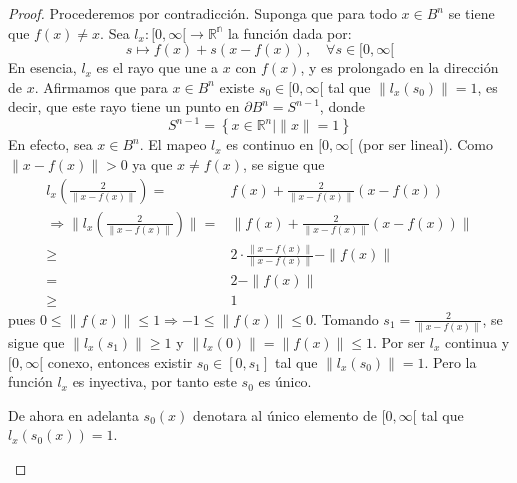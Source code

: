 \documentclass[12pt]{report}
\theoremstyle{largebreak}
\newcommand\cf[3]{\ensuremath{#1:#2\rightarrow#3}}
\begin{document}
\begin{proof}
    Procederemos por contradicción. Suponga que para todo $x\in B^n$ se tiene que $f(x)\neq x$. Sea $\cf{l_x}{[0,\infty[}{\mathbb{R^n}}$ la función dada por:
    \begin{equation*}
        s\mapsto f(x)+s\left(x-f(x)\right),\quad \forall s\in[0,\infty[
    \end{equation*}
    En esencia, $l_x$ es el rayo que une a $x$ con $f(x)$, y es prolongado en la dirección de $x$. Afirmamos que para $x\in B^n$ existe $s_0\in[0,\infty[$ tal que $\|l_x(s_0)\|=1$, es decir, que este rayo tiene un punto en $\partial B^n=S^{n-1}$, donde
    \begin{equation*}
        S^{n-1}=\left\{x\in\mathbb{R}^n|\|x\|=1\right\}
    \end{equation*}
    En efecto, sea $x\in B^n$. El mapeo $l_x$ es continuo en $[0,\infty[$ (por ser lineal). Como $\|x-f(x)\|>0$ ya que $x\neq f(x)$, se sigue que
    \begin{equation*}
        \begin{split}
            l_x(\frac{2}{\|x-f(x)\|})=&f(x)+\frac{2}{\|x-f(x)\|}\left(x-f(x)\right)\\
            \Rightarrow \|l_x(\frac{2}{\|x-f(x)\|})\|=&\|f(x)+\frac{2}{\|x-f(x)\|}\left(x-f(x)\right)\|\\
            \geq& 2\cdot\frac{\|x-f(x)\|}{\|x-f(x)\|}-\|f(x)\|\\
            =&2-\|f(x)\|\\
            \geq&1
        \end{split}
    \end{equation*}
    pues $0\leq \|f(x)\|\leq 1 \Rightarrow -1\leq \|f(x)\|\leq 0$. Tomando $s_1=\frac{2}{\|x-f(x)\|}$, se sigue que $\|l_x(s_1)\|\geq 1$ y $\|l_x(0)\|=\|f(x)\|\leq 1$. Por ser $l_x$ continua y $[0,\infty[$ conexo, entonces existir $s_0\in[0,s_1]$ tal que $\|l_x(s_0)\|=1$. Pero la función $l_x$ es inyectiva, por tanto este $s_0$ es único.

    \begin{obs}
    De ahora en adelanta $s_0(x)$ denotara al único elemento de $[0,\infty[$ tal que $l_x(s_0(x))=1$.
    \end{obs}


\end{proof}
\end{document}
